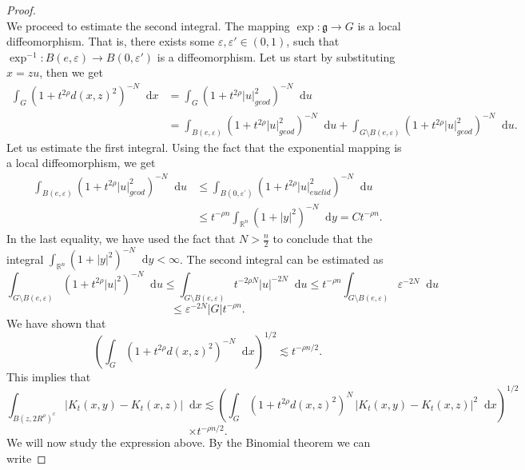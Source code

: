 \documentclass[12pt, reqno]{amsart}
\theoremstyle{definition}
\theoremstyle{remark}
\numberwithin{equation}{section}
\newcommand*\diff{\mathop{}\!\mathrm{d}}
\begin{document}
\begin{proof}
\begin{equation*}
\end{equation*}
We proceed to estimate the second integral. The mapping $\exp\colon\mathfrak{g}\to G$ is a local diffeomorphism. That is, there exists some $\varepsilon,\varepsilon'\in(0,1)$, such that $\exp^{-1}\colon B(e,\varepsilon)\to B(0,\varepsilon')$ is a diffeomorphism. Let us start by substituting $x=zu$, then we get
    \begin{equation*}
\begin{aligned}
    \int_{G}(1+t^{2\rho}d(x,z)^2)^{-N}\diff{x}&=\int_{G}(1+t^{2\rho}|u|_{geod}^{2})^{-N}\diff{u}\\
    &=\int_{B(e,\varepsilon)}(1+t^{2\rho}|u|_{geod}^{2})^{-N}\diff{u}+\int_{G\setminus B(e,\varepsilon)}(1+t^{2\rho}|u|_{geod}^{2})^{-N}\diff{u}.
\end{aligned}
\end{equation*}
Let us estimate the first integral. Using the fact that the exponential mapping is a local diffeomorphism, we get 
\begin{equation*}
    \begin{aligned}
        \int_{B(e,\varepsilon)}(1+t^{2\rho}|u|_{geod}^2)^{-N}\diff{u}&\leq\int_{B(0,\varepsilon^{\prime})}(1+t^{2\rho}|u|^2_{euclid})^{-N}\diff{u}\\
        &\leq t^{-\rho n}\int_{\mathbb{R}^n}(1+|y|^2)^{-N}\diff{y}=Ct^{-\rho n}.
    \end{aligned}
\end{equation*}
In the last equality, we have used the fact that $N>\frac{n}{2}$ to conclude that the integral $\int_{\mathbb{R}^n}(1+|y|^2)^{-N}\diff{y}<\infty$. The second integral can be estimated as 
\begin{equation*}
    \int_{G\setminus B(e,\varepsilon)}(1+t^{2\rho}|u|^2)^{-N}\diff{u}\leq\int_{G\setminus B(e,\varepsilon)}t^{-2\rho N}|u|^{-2N}\diff{u}\leq t^{-\rho n}\int_{G\setminus B(e,\varepsilon)}\varepsilon^{-2N}\diff{u}
\end{equation*}
$$\leq\varepsilon^{-2N}|G|t^{-\rho n}.$$
We have shown that 
\begin{equation*}
    \left(\int_{G}(1+t^{2\rho}d(x,z)^2)^{-N}\diff{x}\right)^{1/2}\lesssim t^{-\rho n/2}.
\end{equation*}
This implies that
\begin{equation*}
    \int_{B(z,2R^{\rho})^c}|K_t(x,y)-K_t(x,z)|\diff{x}\lesssim
\left(
\int_{G} (1+t^{2\rho}d(x,z)^2)^N
\,|K_t(x,y)-K_t(x,z)|^2 \diff{x}
\right)^{1/2}
\end{equation*}
$$\times  t^{-\rho n/2}.$$
We will now study the expression above. By the Binomial theorem we can write 

\end{proof}
\end{document}
